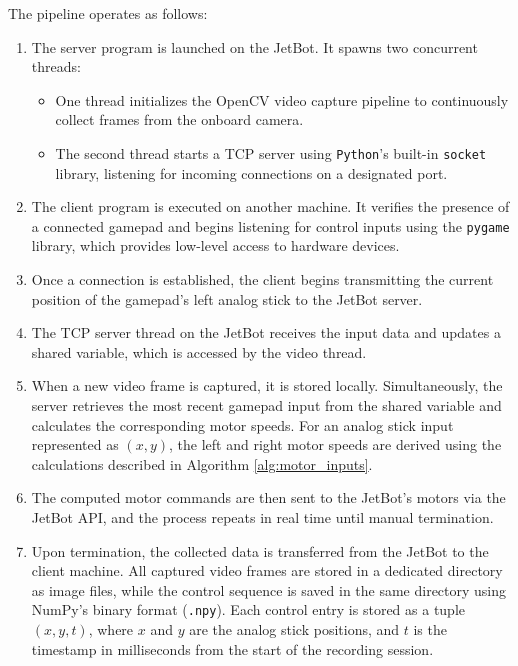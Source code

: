 The pipeline operates as follows:

\begin{enumerate}
  \item The server program is launched on the JetBot. It spawns two concurrent threads:
    \begin{itemize}
      \item One thread initializes the OpenCV video capture pipeline to continuously collect frames from the onboard camera.
      \item The second thread starts a TCP server using \texttt{Python}’s built-in \texttt{socket} library, listening for incoming connections on a designated port.
    \end{itemize}

  \item The client program is executed on another machine. It verifies the presence of a connected gamepad and begins listening for control inputs using the \texttt{pygame} library, which provides low-level access to hardware devices.

  \item Once a connection is established, the client begins transmitting the current position of the gamepad’s left analog stick to the JetBot server.

  \item The TCP server thread on the JetBot receives the input data and updates a shared variable, which is accessed by the video thread.

  \item When a new video frame is captured, it is stored locally. Simultaneously, the server retrieves the most recent gamepad input from the shared variable and calculates the corresponding motor speeds. For an analog stick input represented as \( (x, y) \), the left and right motor speeds are derived using the calculations described in Algorithm \ref{alg:motor_inputs}.

  \item The computed motor commands are then sent to the JetBot’s motors via the JetBot API, and the process repeats in real time until manual termination.

  \item Upon termination, the collected data is transferred from the JetBot to the client machine. All captured video frames are stored in a dedicated directory as image files, while the control sequence is saved in the same directory using NumPy's binary format (\texttt{.npy}). Each control entry is stored as a tuple \( (x, y, t) \), where \( x \) and \( y \) are the analog stick positions, and \( t \) is the timestamp in milliseconds from the start of the recording session.
\end{enumerate}


